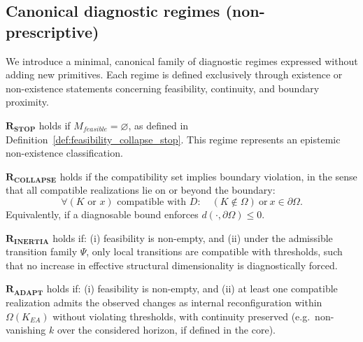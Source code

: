 \subsection{Canonical diagnostic regimes (non-prescriptive)}
We introduce a minimal, canonical family of diagnostic regimes expressed without
adding new primitives.
Each regime is defined exclusively through existence or non-existence statements
concerning feasibility, continuity, and boundary proximity.

\begin{definition}
\label{def:regime_stop}
$\mathbf{R_{STOP}}$ holds if $M_{feasible} = \varnothing$, as defined in
Definition~\ref{def:feasibility_collapse_stop}.
This regime represents an epistemic non-existence classification.
\end{definition}

\begin{definition}
\label{def:regime_collapse}
$\mathbf{R_{COLLAPSE}}$ holds if the compatibility set implies boundary violation,
in the sense that all compatible realizations lie on or beyond the boundary:
\[
\forall (K \text{ or } x) \text{ compatible with } D:\quad
(K \notin \Omega) \ \text{or}\ x \in \partial\Omega.
\]
Equivalently, if a diagnosable bound enforces $d(\cdot,\partial\Omega)\le 0$.
\end{definition}

\begin{definition}
\label{def:regime_inertia}
$\mathbf{R_{INERTIA}}$ holds if:
(i) feasibility is non-empty, and
(ii) under the admissible transition family $\Psi$, only local transitions are
compatible with thresholds, such that no increase in effective structural
dimensionality is diagnostically forced.
\end{definition}

\begin{definition}
\label{def:regime_adapt}
$\mathbf{R_{ADAPT}}$ holds if:
(i) feasibility is non-empty, and
(ii) at least one compatible realization admits the observed changes as internal
reconfiguration within $\Omega(K_{EA})$ without violating thresholds, with
continuity preserved (e.g.\ non-vanishing $k$ over the considered horizon, if
defined in the core).
\end{definition}

